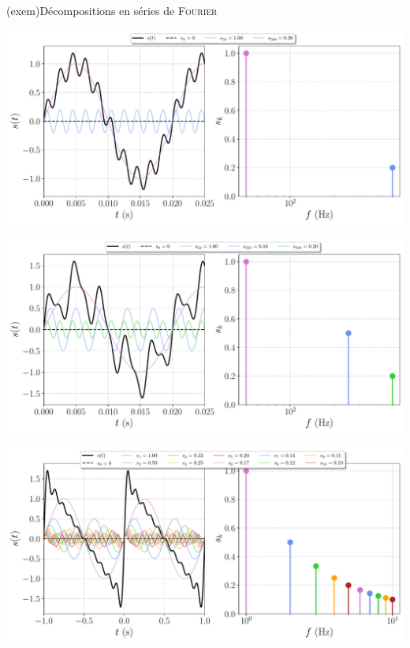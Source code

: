 \documentclass[../../main/main.tex]{subfiles}
\begin{document}

\begin{tcb*}[breakable](exem){Décompositions en séries de \textsc{Fourier}}
	\begin{minipage}{\linewidth}
		\centering
		\includegraphics[width=.85\linewidth]{fft_50_[1,10]_[1,0.2]}
	\end{minipage}

	\begin{minipage}{\linewidth}
		\centering
		\includegraphics[width=.85\linewidth]{fft_50_[1,5,10]_[1,0.5,0.2]}
		\label{fig:3some}
	\end{minipage}

	\begin{minipage}{\linewidth}
		\centering
		\includegraphics[width=.85\linewidth]{fft_add}
	\end{minipage}


\end{tcb*}
\end{document}
